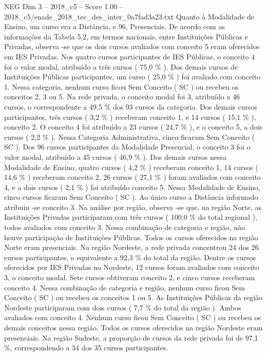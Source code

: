 \begin{textsample}{NEG Dim 3 – 2018\_c5 – Score 1.00 – 2018\_c5/enade\_2018\_tec\_des\_inter\_0a7fad3a23.txt}
Quanto à Modalidade de Ensino, um curso era a Distância, e 96, Presenciais.
De acordo com as informações da Tabela 5.2, em termos nacionais, entre Instituições Públicas e Privadas, observa -se que os dois cursos avaliados com conceito 5 eram oferecidos em IES Privadas.
Nos quatro cursos participantes de IES Públicas, o conceito 4 foi o valor modal, atribuído a três cursos ( 75,0 \% ).
Dos demais cursos de Instituições Públicas participantes, um curso ( 25,0 \% ) foi avaliado com conceito 1.
Nessa categoria, nenhum curso ficou Sem Conceito ( SC ) ou recebeu os conceitos 2, 3 ou 5.
Na rede privada, o conceito modal foi 3, atribuído a 46 cursos, o correspondente a 49,5 \% dos 93 cursos da categoria.
Dos demais cursos participantes, três cursos ( 3,2 \% ) receberam conceito 1, e 14 cursos ( 15,1 \% ), conceito 2.
O conceito 4 foi atribuído a 23 cursos ( 24,7 \% ), e o conceito 5, a dois cursos ( 2,2 \% ).
Nessa Categoria Administrativa, cinco ficaram Sem Conceito ( SC ).
Dos 96 cursos participantes da Modalidade Presencial, o conceito 3 foi o valor modal, atribuído a 45 cursos ( 46,9 \% ).
Dos demais cursos nessa Modalidade de Ensino, quatro cursos ( 4,2 \% ) receberam conceito 1, 14 cursos ( 14,6 \% ) receberam conceito 2, 26 cursos ( 27,1 \% ) foram avaliados com conceito 4, e a dois cursos ( 2,1 \% ) foi atribuído conceito 5.
Nessa Modalidade de Ensino, cinco cursos ficaram Sem Conceito ( SC ).
Ao único curso a Distância informado atribuiu -se conceito 3.
Na análise por região, observa -se que, na região Norte, as Instituições Privadas participaram com três cursos ( 100,0 \% do total regional ), todos avaliados com conceito 3.
Nessa combinação de categoria e região, não houve participação de Instituições Públicas.
Todos os cursos oferecidos na região Norte eram presenciais.
Na região Nordeste, a rede privada concentrou 24 dos 26 cursos participantes, o equivalente a 92,3 \% do total da região.
Dentre os cursos oferecidos por IES Privadas no Nordeste, 12 cursos foram avaliados com conceito 3, o conceito modal.
Sete cursos obtiveram conceito 2, e cinco cursos receberam conceito 4.
Nessa combinação de categoria e região, nenhum curso ficou Sem Conceito ( SC ) ou recebeu os conceitos 1 ou 5.
As Instituições Públicas da região Nordeste participaram com dois cursos ( 7,7 \% do total da região ).
Ambos avaliados com conceito 4.
Nenhum curso ficou Sem Conceito ( SC ) ou recebeu os demais conceitos nessa região.
Todos os cursos oferecidos na região Nordeste eram presenciais.
Na região Sudeste, a proporção de cursos da rede privada foi de 97,1 \%, correspondendo a 34 dos 35 cursos participantes.

\end{textsample}
